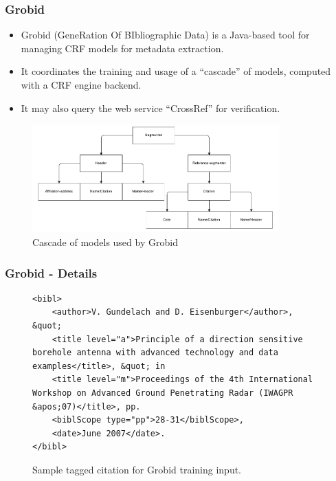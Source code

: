 \documentclass{beamer}
\begin{document}
\begin{frame}
\frametitle{Grobid}
\begin{itemize}
\item Grobid (GeneRation Of BIbliographic Data) is a Java-based tool for managing CRF models for metadata extraction.
\item It coordinates the training and usage of a ``cascade'' of models, computed with a CRF engine backend.
\item It may also query the web service ``CrossRef'' for verification.
\end{itemize}
\begin{figure}[!ht]
\center
\includegraphics[width=3.75in]{figures/cascade.pdf}
\caption{Cascade of models used by Grobid}
\end{figure}
\end{frame}


\begin{frame}[fragile]
\frametitle{Grobid - Details}

\begin{figure}
\lstset{language=XML}
\begin{lstlisting}
<bibl>
	<author>V. Gundelach and D. Eisenburger</author>, &quot; 
	<title level="a">Principle of a direction sensitive borehole antenna with advanced technology and data examples</title>, &quot; in 
	<title level="m">Proceedings of the 4th International Workshop on Advanced Ground Penetrating Radar (IWAGPR &apos;07)</title>, pp. 
	<biblScope type="pp">28-31</biblScope>, 
	<date>June 2007</date>.
</bibl>
\end{lstlisting}
\caption{Sample tagged citation for Grobid training input.}
\end{figure}

\end{frame}

\end{document}
